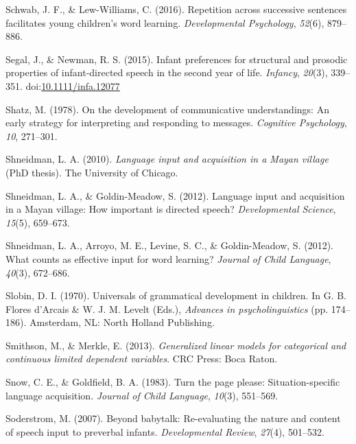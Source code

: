 \documentclass[floatsintext,man]{apa6}
\theoremstyle{definition}
\theoremstyle{definition}
\theoremstyle{definition}
\theoremstyle{remark}
\begin{document}
\hypertarget{ref-schwab2016repetition}{}
Schwab, J. F., \& Lew-Williams, C. (2016). Repetition across successive
sentences facilitates young children's word learning.
\emph{Developmental Psychology}, \emph{52}(6), 879--886.

\hypertarget{ref-segal2015infant}{}
Segal, J., \& Newman, R. S. (2015). Infant preferences for structural
and prosodic properties of infant-directed speech in the second year of
life. \emph{Infancy}, \emph{20}(3), 339--351.
doi:\href{https://doi.org/10.1111/infa.12077}{10.1111/infa.12077}

\hypertarget{ref-shatz1978development}{}
Shatz, M. (1978). On the development of communicative understandings: An
early strategy for interpreting and responding to messages.
\emph{Cognitive Psychology}, \emph{10}, 271--301.

\hypertarget{ref-shneidman2010language}{}
Shneidman, L. A. (2010). \emph{Language input and acquisition in a Mayan
village} (PhD thesis). The University of Chicago.

\hypertarget{ref-shneidman2012language}{}
Shneidman, L. A., \& Goldin-Meadow, S. (2012). Language input and
acquisition in a Mayan village: How important is directed speech?
\emph{Developmental Science}, \emph{15}(5), 659--673.

\hypertarget{ref-shneidman2012counts}{}
Shneidman, L. A., Arroyo, M. E., Levine, S. C., \& Goldin-Meadow, S.
(2012). What counts as effective input for word learning? \emph{Journal
of Child Language}, \emph{40}(3), 672--686.

\hypertarget{ref-slobin1970universals}{}
Slobin, D. I. (1970). Universals of grammatical development in children.
In G. B. Flores d'Arcais \& W. J. M. Levelt (Eds.), \emph{Advances in
psycholinguistics} (pp. 174--186). Amsterdam, NL: North Holland
Publishing.

\hypertarget{ref-smithson2013generalized}{}
Smithson, M., \& Merkle, E. (2013). \emph{Generalized linear models for
categorical and continuous limited dependent variables}. CRC Press: Boca
Raton.

\hypertarget{ref-snow1983turn}{}
Snow, C. E., \& Goldfield, B. A. (1983). Turn the page please:
Situation-specific language acquisition. \emph{Journal of Child
Language}, \emph{10}(3), 551--569.

\hypertarget{ref-soderstrom2007beyond}{}
Soderstrom, M. (2007). Beyond babytalk: Re-evaluating the nature and
content of speech input to preverbal infants. \emph{Developmental
Review}, \emph{27}(4), 501--532.
\end{document}
